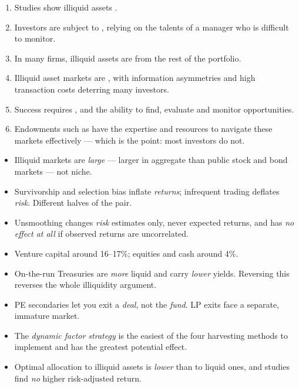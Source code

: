 \begin{enumerate}
\item Studies show illiquid assets .
\item Investors are subject to , relying on the talents of a
manager who is difficult to monitor.
\item In many firms, illiquid assets are  from the rest
of the portfolio.
\item Illiquid asset markets are , with information
asymmetries and high transaction costs deterring many investors.
\item Success requires , and the ability to
find, evaluate and monitor opportunities.
\item Endowments such as  have the expertise and
resources to navigate these markets effectively --- which is the point: most
investors do not.
\end{enumerate}

\begin{imtrapbox}[title={Consolidated trap summary --- IM-17}]
\begin{itemize}
\item {} Illiquid markets are \emph{large} --- larger in
aggregate than public stock and bond markets --- not niche.
\item {} Survivorship and selection bias inflate
\emph{returns}; infrequent trading deflates \emph{risk}. Different halves of the
pair.
\item {} Unsmoothing changes \emph{risk} estimates only,
never expected returns, and has \emph{no effect at all} if observed returns are
uncorrelated.
\item {} Venture capital around 16--17\%; equities and cash
around 4\%.
\item {} On-the-run Treasuries are \emph{more} liquid and
carry \emph{lower} yields. Reversing this reverses the whole illiquidity argument.
\item {} PE secondaries let you exit a \emph{deal}, not the
\emph{fund}. LP exits face a separate, immature market.
\item {} The \emph{dynamic factor strategy} is the easiest
of the four harvesting methods to implement and has the greatest potential effect.
\item {} Optimal allocation to illiquid assets is
\emph{lower} than to liquid ones, and studies find \emph{no} higher risk-adjusted
return.
\end{itemize}
\end{imtrapbox}
